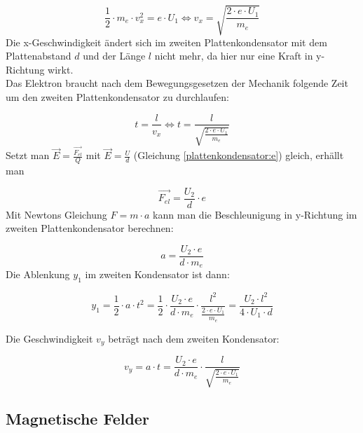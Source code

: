 \documentclass[a4paper]{article}
\begin{document}
					\begin{equation}
						\frac{1}{2}\cdot m_e \cdot v_x^2 = e \cdot U_1 \Leftrightarrow v_x = \sqrt{\frac{2\cdot e\cdot U_1}{m_e}}
					\end{equation}
					Die x-Geschwindigkeit ändert sich im zweiten Plattenkondensator mit dem Plattenabstand $d$ und der Länge $l$ nicht mehr, da hier nur eine Kraft in y-Richtung wirkt.\\
					Das Elektron braucht nach dem Bewegungsgesetzen der Mechanik folgende Zeit um den zweiten Plattenkondensator zu durchlaufen:
					
					\begin{equation}
						t=\frac{l}{v_x}\Leftrightarrow t=\frac{l}{\sqrt{\frac{2\cdot e\cdot U_1}{m_e}}}
					\end{equation}
					Setzt man  $\vec{E}=\frac{\vec{F_{el}}}{Q}$ mit $\vec{E}=\frac{U}{d}$ (Gleichung \ref{plattenkondensator:e}) gleich, erhällt man
					
					\begin{equation}
						\vec{F_{el}} = \frac{U_2}{d}\cdot e
					\end{equation}
					Mit Newtons Gleichung $F=m\cdot a$ kann man die Beschleunigung in y-Richtung im zweiten Plattenkondensator berechnen:
					
					\begin{equation}
						a = \frac{U_2\cdot e}{d\cdot m_e}
					\end{equation}
					Die Ablenkung $y_1$ im zweiten Kondensator ist dann:
					
					\begin{equation}
						y_1 = \frac{1}{2}\cdot a \cdot t^2 = \frac{1}{2}\cdot \frac{U_2\cdot e}{d\cdot m_e} \cdot \frac{l^2}{\frac{2\cdot e\cdot U_1}{m_e}}=\frac{U_2\cdot l^2}{4\cdot U_1\cdot d}
					\end{equation}
					
					Die Geschwindigkeit $v_y$ beträgt nach dem zweiten Kondensator:
					
					\begin{equation}
						v_y = a\cdot t = \frac{U_2\cdot e}{d\cdot m_e} \cdot \frac{l}{\sqrt{\frac{2\cdot e\cdot U_1}{m_e}}}
					\end{equation}
					
					
	
		\subsection{Magnetische Felder}
		
\end{document}
